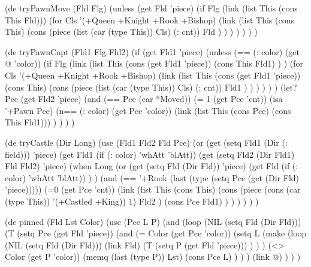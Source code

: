 \begin{wideverbatim}

 
(de tryPawnMove (Fld Flg)
   (unless (get Fld 'piece)
      (if Flg
         (link (list This (cons This Fld)))
         (for Cls '(+Queen +Knight +Rook +Bishop)
            (link
               (list This
                  (cons This)
                  (cons
                     (piece (list (car (type This)) Cls) (: cnt))
                     Fld ) ) ) ) ) ) )
 
(de tryPawnCapt (Fld1 Flg Fld2)
   (if (get Fld1 'piece)
      (unless (== (: color) (get @ 'color))
         (if Flg
            (link
               (list This
                  (cons (get Fld1 'piece))
                  (cons This Fld1) ) )
            (for Cls '(+Queen +Knight +Rook +Bishop)
               (link
                  (list This
                     (cons (get Fld1 'piece))
                     (cons This)
                     (cons
                        (piece (list (car (type This)) Cls) (: cnt))
                        Fld1 ) ) ) ) ) )
      (let? Pce (get Fld2 'piece)
         (and
            (== Pce (car *Moved))
            (= 1 (get Pce 'cnt))
            (isa '+Pawn Pce)
            (n== (: color) (get Pce 'color))
            (link (list This (cons Pce) (cons This Fld1))) ) ) ) )


\end{wideverbatim}

\begin{wideverbatim}
 
(de tryCastle (Dir Long)
   (use (Fld1 Fld2 Fld Pce)
      (or
         (get (setq Fld1 (Dir (: field))) 'piece)
         (get Fld1 (if (: color) 'whAtt 'blAtt))
         (get (setq Fld2 (Dir Fld1)  Fld Fld2) 'piece)
         (when Long
            (or
               (get (setq Fld (Dir Fld)) 'piece)
               (get Fld (if (: color) 'whAtt 'blAtt)) ) )
         (and
            (== '+Rook (last (type (setq Pce (get (Dir Fld) 'piece)))))
            (=0 (get Pce 'cnt))
            (link
               (list This
                  (cons This)
                  (cons
                     (piece (cons (car (type This)) '(+Castled +King)) 1)
                     Fld2 )
                  (cons Pce Fld1) ) ) ) ) ) )

(de pinned (Fld Lst Color)
   (use (Pce L P)
      (and
         (loop
            (NIL (setq Fld (Dir Fld)))
            (T (setq Pce (get Fld 'piece))
               (and
                  (= Color (get Pce 'color))
                  (setq L
                     (make
                        (loop
                           (NIL (setq Fld (Dir Fld)))
                           (link Fld)
                           (T (setq P (get Fld 'piece))) ) ) )
                  (<> Color (get P 'color))
                  (memq (last (type P)) Lst)
                  (cons Pce L) ) ) )
         (link @) ) ) )
 


\end{wideverbatim}

